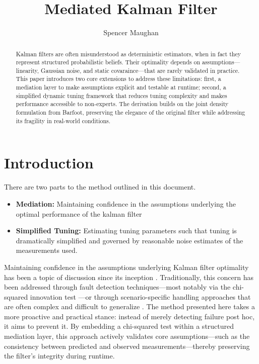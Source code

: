 \documentclass[a4paper]{article}
\title{Mediated Kalman Filter}
\author{Spencer Maughan}
\date{}
\begin{document}
	\maketitle

	\begin{abstract}
		Kalman filters are often misunderstood as deterministic estimators, when in fact they represent structured probabilistic beliefs. Their optimality depends on assumptions—linearity, Gaussian noise, and static covaraince—that are rarely validated in practice. This paper introduces two core extensions to address these limitations: first, a mediation layer to make assumptions explicit and testable at runtime; second, a simplified dynamic tuning framework that reduces tuning complexity and makes performance accessible to non-experts. The derivation builds on the joint density formulation from Barfoot, preserving the elegance of the original filter while addressing its fragility in real-world conditions.
	\end{abstract}

	\section{Introduction}
	There are two parts to the method outlined in this document.
	\begin{itemize}
		\item {\bfseries Mediation:} Maintaining confidence in the assumptions underlying the optimal performance of the kalman filter
		\item {\bfseries Simplified Tuning:} Estimating tuning parameters such that tuning is dramatically simplified and governed by reasonable noise estimates of the measurements used.
	\end{itemize}
Maintaining confidence in the assumptions underlying Kalman filter optimality has been a topic of discussion since its inception \cite{kalman1960new, maybeck1982stochastic}. Traditionally, this concern has been addressed through fault detection techniques—most notably via the chi-squared innovation test \cite{jazwinski2007stochastic}—or through scenario-specific handling approaches that are often complex and difficult to generalize \cite{barfoot2017state}. The method presented here takes a more proactive and practical stance: instead of merely detecting failure post hoc, it aims to prevent it. By embedding a chi-squared test within a structured mediation layer, this approach actively validates core assumptions—such as the consistency between predicted and observed measurements—thereby preserving the filter’s integrity during runtime.
\end{document}

